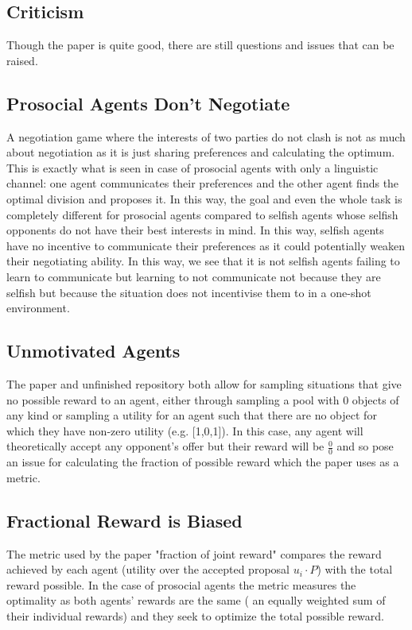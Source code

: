 \documentclass{article}
\begin{document}
\subsection{Criticism}%
\label{sub:criticism}

Though the paper is quite good, there are still questions and issues that can be
raised.

\subsection{Prosocial Agents Don't Negotiate}%
\label{sub:prosocial_agents_don_t_negotiate}
A negotiation game where the interests of two parties do not clash is not as
much about negotiation as it is just sharing preferences and calculating the
optimum. This is exactly what is seen in case of prosocial agents with only a
linguistic channel: one agent communicates their preferences and the other
agent finds the optimal division and proposes it. In this way, the goal and even
the whole task is completely different for prosocial agents compared to selfish
agents whose selfish opponents do not have their best interests in mind. In this
way, selfish agents have no incentive to communicate their preferences as it
could potentially weaken their negotiating ability. In this way, we see that it
is not selfish agents failing to learn to communicate but learning to not
communicate not because they are selfish but because the situation does not
incentivise them to in a one-shot environment.


\subsection{Unmotivated Agents}%
\label{sub:unmotivated_agents}
The paper and unfinished repository both allow for sampling situations that give
no possible reward to an agent, either through sampling a pool with 0 objects of
any kind or sampling a utility for an agent such that there are no object for
which they have non-zero utility (e.g. [1,0,1]). In this case, any agent will
theoretically accept any opponent's offer but their reward will be $\frac{0}{0}$
and so pose an issue for calculating the fraction of possible reward which the
paper uses as a metric.

\subsection{Fractional Reward is Biased}%
\label{sub:fractional_reward_is_biased}
The metric used by the paper "fraction of joint reward" compares the reward
achieved by each agent (utility over the accepted proposal $u_i \cdot P$) with
the total reward possible. In the case of prosocial
agents the metric measures the optimality as both agents' rewards are the same (
an equally weighted sum of their individual rewards) and they seek to optimize
the total possible reward.
\end{document}
